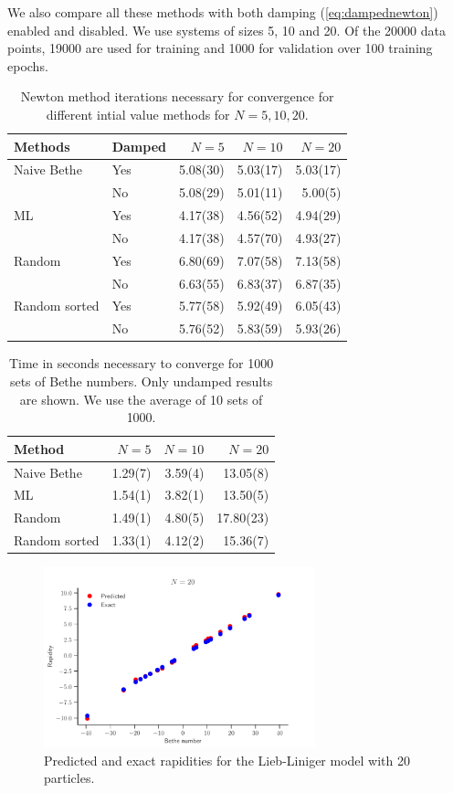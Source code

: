 \documentclass[11pt, a4paper]{report} %
\begin{document}
We also compare all these methods with both damping (\cref{eq:dampednewton}) enabled and disabled. We use systems of sizes 5, 10 and 20.
Of the 20000 data points, 19000 are used for training and 1000 for validation over 100 training epochs.


\begin{table}[tb!]
  \centering
  \begin{tabular}{llrrr}
    Methods & Damped & \(N=5\) & \(N=10\) & \(N=20\) \\\hline 
    Naive Bethe & Yes & 5.08(30) & 5.03(17) & 5.03(17) \\ 
           & No & 5.08(29) & 5.01(11) & 5.00(5) \\\hline
    ML & Yes & 4.17(38) & 4.56(52) & 4.94(29) \\
           & No & 4.17(38) & 4.57(70) & 4.93(27) \\\hline
    Random & Yes & 6.80(69) & 7.07(58) & 7.13(58) \\
           & No & 6.63(55) & 6.83(37) & 6.87(35) \\\hline
    Random sorted  & Yes & 5.77(58) & 5.92(49) & 6.05(43)  \\
           & No & 5.76(52) & 5.83(59) & 5.93(26)
  \end{tabular}
  \caption{Newton method iterations necessary for convergence for different intial value methods for \(N=5,10,20\).}
\end{table}


\begin{table}[tb!]
  \centering
  \begin{tabular}{lrrr}
    Method & \(N=5\) & \(N=10\) & \(N=20\) \\\hline
    Naive Bethe & 1.29(7) & 3.59(4) & 13.05(8)\\
    ML & 1.54(1) & 3.82(1) & 13.50(5)\\
    Random & 1.49(1) & 4.80(5) & 17.80(23) \\
    Random sorted & 1.33(1) & 4.12(2) & 15.36(7) 
  \end{tabular}
  \caption{Time in seconds necessary to converge for 1000 sets of Bethe numbers. Only undamped results are shown. We use the average of 10 sets of 1000.}
\end{table}


\begin{figure}[tb!]
  \centering
  \includegraphics[width=0.70\textwidth]{rapidities_20.pdf}
  \caption{Predicted and exact rapidities for the Lieb-Liniger model with 20 particles.}
\end{figure}
\end{document}
